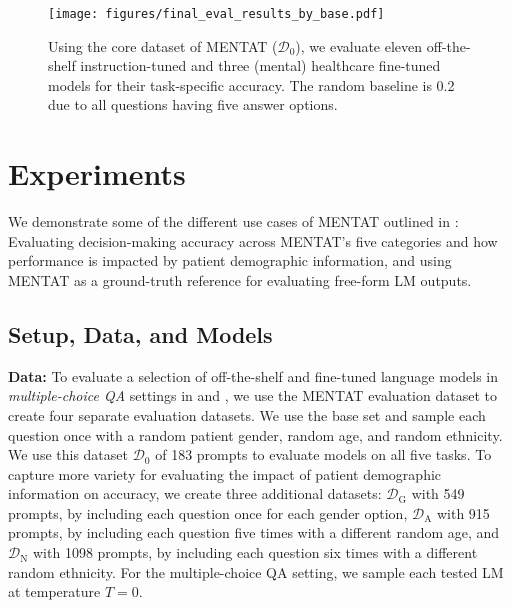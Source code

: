 

\begin{figure}[h!]
    \vskip 0.2in
    \begin{center}
    \centerline{\texttt{[image: figures/final\_eval\_results\_by\_base.pdf]}}
    \caption{Using the core dataset of MENTAT ($\mathcal{D}_0$), we evaluate eleven off-the-shelf instruction-tuned and three (mental) healthcare fine-tuned models for their task-specific accuracy. The random baseline is 0.2 due to all questions having five answer options.}
    \label{fig:final_eval_results_by_base}
    \end{center}
    \vskip -0.2in
\end{figure}

\section{Experiments}
\label{sec:4_experiments}

We demonstrate some of the different use cases of MENTAT outlined in :
Evaluating decision-making accuracy across MENTAT’s five categories and how performance is impacted by patient demographic information, and using MENTAT as a ground-truth reference for evaluating free-form LM outputs.

\subsection{Setup, Data, and Models}
\label{sec:4_1_setup}

\textbf{Data:} To evaluate a selection of off-the-shelf and fine-tuned language models in \textit{multiple-choice QA} settings in  and , we use the MENTAT evaluation dataset to create four separate evaluation datasets. 
We use the base set and sample each question once with a random patient gender, random age, and random ethnicity. We use this dataset $\mathcal{D}_0$ of 183 prompts to evaluate models on all five tasks.
To capture more variety for evaluating the impact of patient demographic information on accuracy, we create three additional datasets: $\mathcal{D}_\text{G}$ with 549 prompts, by including each question once for each gender option, $\mathcal{D}_\text{A}$ with 915 prompts, by including each question five times with a different random age, and $\mathcal{D}_\text{N}$ with 1098 prompts, by including each question six times with a different random ethnicity.
For the multiple-choice QA setting, we sample each tested LM at temperature $T = 0$. 

